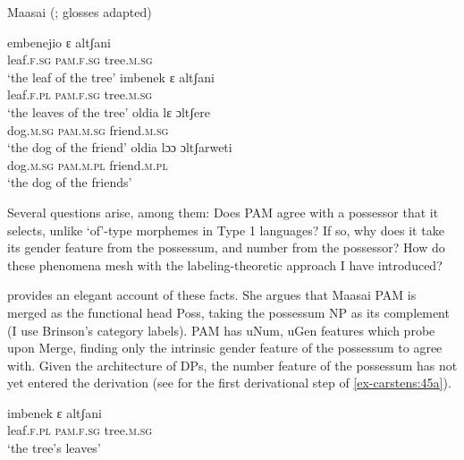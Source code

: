 \documentclass[output=paper
,modfonts
,nonflat]{langsci/langscibook}
\begin{document}
\begin{exe}
	\ex  Maasai (\citealt{Brinson2014}; glosses adapted)\label{ex-carstens:44}
	{\multicolsep=0pt\begin{multicols}{2}\xlist
	\ex \label{ex-carstens:44a}
	\gll embenejio   ɛ         altʃani\\
	leaf.\textsc{f.sg}      \textsc{pam.f.sg}  tree.\textsc{m.sg}\\
	\glt `the leaf of the tree'  	
	\ex \label{ex-carstens:44b}
	\gll imbenek     ɛ         altʃani\\
	leaf.\textsc{f.pl}      \textsc{pam.f.sg}  tree.\textsc{m.sg}\\
	\glt `the leaves of the tree'
	\ex \label{ex-carstens:44c}
	\gll  oldia     lɛ           ɔltʃere\\
	dog.\textsc{m.sg}  \textsc{pam.m.sg}    friend.\textsc{m.sg}\\
	\glt `the dog of the friend'
	\ex \label{ex-carstens:44d}
	\gll  oldia    lɔɔ         ɔltʃarweti\\
	dog.\textsc{m.sg}  \textsc{pam.m.pl}    friend.\textsc{m.pl}\\
	\glt `the dog of the friends'
	\endxlist\end{multicols}}
\end{exe}
Several questions arise, among them: Does PAM agree with a possessor that it selects, unlike ‘of’-type morphemes in Type 1 languages? If so, why does it take its gender feature from the possessum, and number from the possessor? How do these phenomena mesh with the labeling-theoretic approach I have introduced? 

\citet{Brinson2014} provides an elegant account of these facts. She argues that Maasai PAM is merged as the functional head Poss, taking the possessum NP as its complement (I use Brinson's category labels). PAM has uNum, uGen features which probe upon Merge, finding only the intrinsic gender feature of the possessum to agree with. Given the architecture of DPs, the number feature of the possessum has not yet entered the derivation (see  for the first derivational step of \ref{ex-carstens:45a}).

\begin{exe}
	\ex\label{ex-carstens:45a}
	\gll imbenek     ɛ         altʃani\\
	leaf.\textsc{f.pl}      \textsc{pam.f.sg}  tree.\textsc{m.sg}\\
	\glt `the tree's leaves'
\end{exe}  
\end{document}
